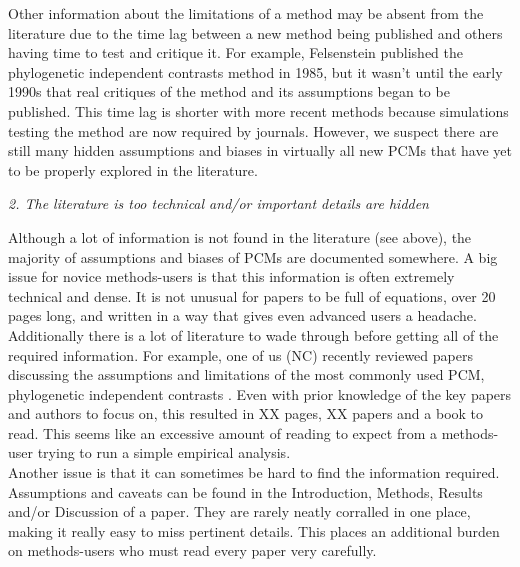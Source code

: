 \documentclass[a4paper,12pt]{article}
\renewcommand{\subsection}[1]{
  \bigskip
  \begin{center}
  \begin{large}
  \normalfont\itshape #1
  \end{large}
  \end{center}
}
\begin{document}

Other information about the limitations of a method may be absent from the literature due to the time lag between a new method being published and others having time to test and critique it. 
For example, Felsenstein published the phylogenetic independent contrasts method in 1985, but it wasn't until the early 1990s that real critiques of the method and its assumptions began to be published. %
This time lag is shorter with more recent methods because simulations testing the method are now required by journals.
However, we suspect there are still many hidden assumptions and biases in virtually all new PCMs that have yet to be properly explored in the literature. 

\subsection{2. The literature is too technical and/or important details are hidden}
Although a lot of information is not found in the literature (see above), the majority of assumptions and biases of PCMs are documented somewhere. 
A big issue for novice methods-users is that this information is often extremely technical and dense.
It is not unusual for papers to be full of equations, over 20 pages long, and written in a way that gives even advanced users a headache. 
Additionally there is a lot of literature to wade through before getting all of the required information. 
For example, one of us (NC) recently reviewed papers discussing the assumptions and limitations of the most commonly used PCM, phylogenetic independent contrasts \citep{felsenstein1985phylogenies}. 
Even with prior knowledge of the key papers and authors to focus on, this resulted in XX pages, XX papers and a book to read. 
This seems like an excessive amount of reading to expect from a methods-user trying to run a simple empirical analysis.\\

Another issue is that it can sometimes be hard to find the information required. Assumptions and caveats can be found in the Introduction, Methods, Results and/or Discussion of a paper. 
They are rarely neatly corralled in one place, making it really easy to miss pertinent details. 
This places an additional burden on methods-users who must read every paper very carefully.
\end{document}

